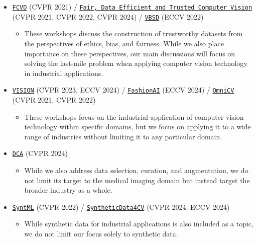 \documentclass{article}
\begin{document}
\begin{itemize}
    \item
    \href{https://visualai.princeton.edu/fcvd}{\texttt{FCVD}} (CVPR 2021) / 
    \href{https://fadetrcv.github.io/2024/}{\texttt{Fair, Data Efficient and Trusted Computer Vision}} (CVPR 2021, CVPR 2022, CVPR 2024) / 
    \href{https://wvbsd.github.io/2022/index.html}{\texttt{VBSD}} (ECCV 2022) 
    \begin{itemize}
        \item These workshops discuss the construction of trustworthy datasets from the perspectives of ethics, bias, and fairness. While we also place importance on these perspectives, our main discussions will focus on solving the last-mile problem when applying computer vision technology in industrial applications.
    \end{itemize}

    \item
    \href{https://vision-based-industrial-inspection.github.io/eccv-24}{\texttt{VISION}} (CVPR 2023, ECCV 2024) / 
    \href{https://sites.google.com/view/fashionai2024}{\texttt{FashionAI}} (ECCV 2024) /
    \href{https://sites.google.com/view/omnicv2022}{\texttt{OmniCV}} (CVPR 2021, CVPR 2022)
    \begin{itemize}
        \item These workshops focus on the industrial application of computer vision technology within specific domains, but we focus on applying it to a wide range of industries without limiting it to any particular domain.
    \end{itemize}

    \item
    \href{https://dca-in-mi.github.io/}{\texttt{DCA}} (CVPR 2024)
    \begin{itemize}
        \item While we also address data selection, curation, and augmentation, we do not limit its target to the medical imaging domain but instead target the broader industry as a whole.
    \end{itemize}

    \item
    \href{https://syntml-cvpr2022-workshop.github.io/}{\texttt{SyntML}} (CVPR 2022) /
    \href{https://syntheticdata4cv.wordpress.com/}{\texttt{SyntheticData4CV}} (CVPR 2024, ECCV 2024)
    \begin{itemize}
        \item While synthetic data for industrial applications is also included as a topic, we do not limit our focus solely to synthetic data.
    \end{itemize}


\end{itemize}
\end{document}
